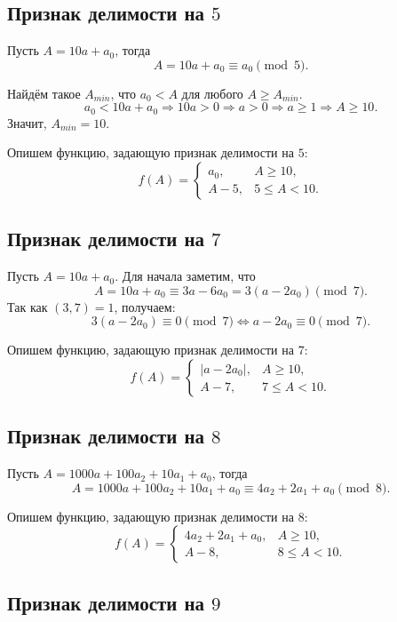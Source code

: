\documentclass[14pt, a4paper]{extarticle}
\theoremstyle{definition}
\begin{document}
\subsection{Признак делимости на $5$}

	Пусть $A=10a+a_0$, тогда
	$$A=10a+a_0\equiv a_0\pmod5.$$

	Найдём такое $A_{min}$, что $a_0<A$ для любого $A\geqslant A_{min}$. 
	$$a_0<10a+a_0\Rightarrow10a>0\Rightarrow a>0\Rightarrow a\geqslant1\Rightarrow A\geqslant10.$$
	Значит, $A_{min}=10$.

	Опишем функцию, задающую признак делимости на $5$:
	$$f(A)=\begin{cases}
		a_0,&A\geqslant10,\\
		A-5,&5\leqslant A<10.
	\end{cases}$$

\subsection{Признак делимости на $7$}

	Пусть $A=10a+a_0$. Для начала заметим, что
	$$A=10a+a_0\equiv3a-6a_0=3(a-2a_0)\pmod7.$$
	Так как $(3,7)=1$, получаем:
	$$\boxed{3(a-2a_0)\equiv0\pmod7\Leftrightarrow a-2a_0\equiv0\pmod7}.$$


	Опишем функцию, задающую признак делимости на $7$:
	$$f(A)=\begin{cases}
		|a-2a_0|,&A\geqslant10,\\
		A-7,&7\leqslant A<10.
	\end{cases}$$

\subsection{Признак делимости на $8$}

	Пусть $A=1000a+100a_2+10a_1+a_0$, тогда
	$$A=1000a+100a_2+10a_1+a_0\equiv4a_2+2a_1+a_0\pmod8.$$

	Опишем функцию, задающую признак делимости на $8$:
	$$f(A)=\begin{cases}
		4a_2+2a_1+a_0,&A\geqslant10,\\
		A-8,&8\leqslant A<10.
	\end{cases}$$

\subsection{Признак делимости на $9$}
	
\end{document}
